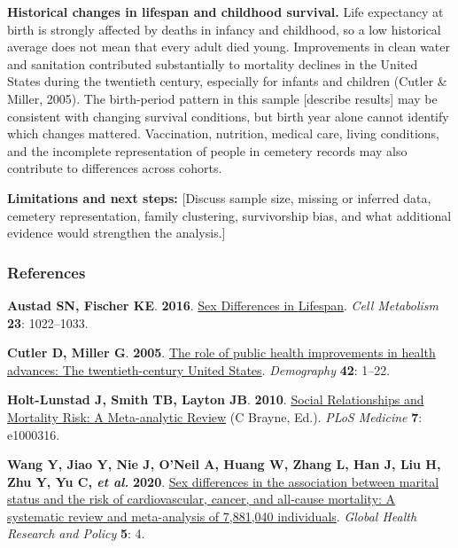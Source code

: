 \documentclass[
  10pt,
  twocolumn]{article}
\newlength{\cslhangindent}
\newenvironment{CSLReferences}[2] %
 {\begin{list}{}{%
  \setlength{\itemindent}{0pt}
  \setlength{\leftmargin}{0pt}
  \setlength{\parsep}{0pt}
  \ifodd #1
   \setlength{\leftmargin}{\cslhangindent}
   \setlength{\itemindent}{-1\cslhangindent}
  \fi
  \setlength{\itemsep}{#2\baselineskip}}}
 {\end{list}}
\begin{document}
\textbf{Historical changes in lifespan and childhood survival.} Life
expectancy at birth is strongly affected by deaths in infancy and
childhood, so a low historical average does not mean that every adult
died young. Improvements in clean water and sanitation contributed
substantially to mortality declines in the United States during the
twentieth century, especially for infants and children (Cutler \&
Miller, 2005). The birth-period pattern in this sample {[}describe
results{]} may be consistent with changing survival conditions, but
birth year alone cannot identify which changes mattered. Vaccination,
nutrition, medical care, living conditions, and the incomplete
representation of people in cemetery records may also contribute to
differences across cohorts.

\textbf{Limitations and next steps:} {[}Discuss sample size, missing or
inferred data, cemetery representation, family clustering, survivorship
bias, and what additional evidence would strengthen the analysis.{]}

\newpage

\subsubsection{References}\label{references}

\protect{}\label{refs}
\begin{CSLReferences}{0}{1}
\textbf{\textbf{Austad SN}, \textbf{Fischer KE}}. \textbf{2016}.
\href{https://doi.org/10.1016/j.cmet.2016.05.019}{Sex {Differences} in
{Lifespan}}. \emph{Cell Metabolism} \textbf{23}: 1022--1033.

\textbf{\textbf{Cutler D}, \textbf{Miller G}}. \textbf{2005}.
\href{https://doi.org/10.1353/dem.2005.0002}{The role of public health
improvements in health advances: {The} twentieth-century {United
States}}. \emph{Demography} \textbf{42}: 1--22.

\textbf{\textbf{Holt-Lunstad J}, \textbf{Smith TB}, \textbf{Layton JB}}.
\textbf{2010}.
\href{https://doi.org/10.1371/journal.pmed.1000316}{Social
{Relationships} and {Mortality Risk}: {A Meta}-analytic {Review}} (C
Brayne, Ed.). \emph{PLoS Medicine} \textbf{7}: e1000316.

\textbf{\textbf{Wang Y}, \textbf{Jiao Y}, \textbf{Nie J}, \textbf{O'Neil
A}, \textbf{Huang W}, \textbf{Zhang L}, \textbf{Han J}, \textbf{Liu H},
\textbf{Zhu Y}, \textbf{Yu C}, \emph{et al.}} \textbf{2020}.
\href{https://doi.org/10.1186/s41256-020-00133-8}{Sex differences in the
association between marital status and the risk of cardiovascular,
cancer, and all-cause mortality: A systematic review and meta-analysis
of 7,881,040 individuals}. \emph{Global Health Research and Policy}
\textbf{5}: 4.

\end{CSLReferences}
\end{document}
